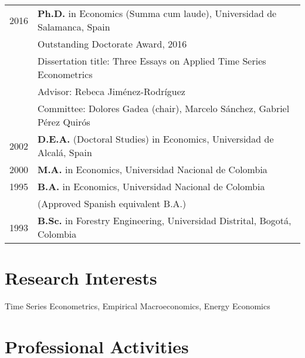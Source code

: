 \documentclass[11pt]{article}\usepackage[]{graphicx}\usepackage[]{color}
\begin{document}
\begin{tabular}{rl{-2cm}} %

2016 & \textbf{Ph.D.} in Economics (Summa cum laude), Universidad de Salamanca, Spain\\
\vspace{1pt}& Outstanding Doctorate Award, 2016\\
\vspace{1pt}& Dissertation title: Three Essays on Applied Time Series Econometrics\\
\vspace{1pt}& Advisor: Rebeca Jiménez-Rodríguez\\
\vspace{5pt}& Committee: Dolores Gadea (chair), Marcelo Sánchez, Gabriel Pérez Quirós\\

\vspace{5pt}2002 & \textbf{D.E.A.} (Doctoral Studies) in Economics, Universidad de Alcalá, Spain\\

\vspace{5pt}2000 & \textbf{M.A.} in Economics, Universidad Nacional de Colombia\\

1995 & \textbf{B.A.} in Economics, Universidad Nacional de Colombia\\
\vspace{5pt}& (Approved Spanish equivalent B.A.)\\

1993 & \textbf{B.Sc.} in Forestry Engineering, Universidad Distrital, Bogotá, Colombia\\

\end{tabular}
\vspace{10pt}

\section{Research Interests}

Time Series Econometrics, Empirical Macroeconomics, Energy Economics
\vspace{10pt}


\section{Professional Activities} 
\end{document}
